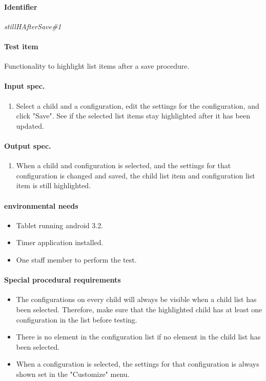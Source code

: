 \clearpage
\paragraph{Identifier}
	\textit{stillHAfterSave\#1}
\paragraph{Test item}
	Functionality to highlight list items after a save procedure.
\paragraph{Input spec.}
	\begin{enumerate}
		\item Select a child and a configuration, edit the settings for the configuration, and click "Save". See if the selected list items stay highlighted after it has been updated.
	\end{enumerate}
\paragraph{Output spec.}
	\begin{enumerate}
		\item When a child and configuration is selected, and the settings for that configuration is changed and saved, the child list item and configuration list item is still highlighted.
	\end{enumerate}
\paragraph{environmental needs}
	\begin{itemize}
		\item Tablet running android 3.2.
		\item Timer application installed.
		\item One staff member to perform the test.
	\end{itemize}
\paragraph{Special procedural requirements}
	\begin{itemize}
		\item The configurations on every child will always be visible when a child list has been selected. Therefore, make sure that the highlighted child has at least one configuration in the list before testing.
		\item There is no element in the configuration list if no element in the child list has been selected.
		\item When a configuration is selected, the settings for that configuration is always shown set in the "Customize" menu.
	\end{itemize}
